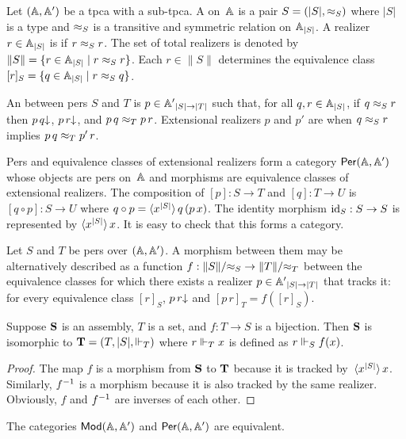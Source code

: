 Let $(\AA, \subAA)$ be a tpca with a sub-tpca. A  on~$\AA$ is a pair $S = (|S|, {\per_S})$ where
$|S|$ is a type and $\per_S$ is a transitive and symmetric
relation on $\xAtyp{S}$. A realizer $r \in \xAtyp{S}$ is  if
$r \per_S r$. The set of total realizers is denoted by $\|S\| = \set{r
  \in \xAtyp{S} \such r \per_S r}$. Each $r \in \|S\|$ determines
the equivalence class $[r]_S = \set{q \in \xAtyp{S} \such r \per_S q}$.

An  between pers $S$ and $T$ is $p \in
\compAtyp{|S| \to |T|}$ such that, for all $q, r \in \xAtyp{S}$, if $q
\per_S r$ then $\defined{p\,q}$, $\defined{p\,r}$, and $p\,q \per_T
p\,r$. Extensional realizers $p$ and $p'$ are  when
$q \per_S r$ implies $p\,q \per_T p'\,r$.

Pers and equivalence classes of extensional realizers form a category
$\Per{\AA, \subAA}$ whose objects are pers on~$\AA$ and morphisms are
equivalence classes of extensional realizers. The composition of $[p]
: S \to T$ and $[q] : T \to U$ is $[q \circ p] : S \to U$ where $q
\circ p = \tpcalam{x}{|S|}{q\,(p\,x)}$. The identity morphism
$\id[S] : S \to S$ is represented by $\tpcalam{x}{|S|} x$. It
is easy to check that this forms a category.

Let $S$ and $T$ be pers over $(\AA, \subAA)$. A morphism between them
may be alternatively described as a function $f : \|S\|/{\per_S} \to
\|T\|/{\per_T}$ between the equivalence classes for which there exists
a realizer $p \in \compAtyp{|S| \to |T|}$ that tracks it: for every
equivalence class $[r]_S$, $\defined{p\,r}$ and $[p\,r]_T = f([r]_S)$.

\begin{lemma}
  \label{lemma:iso-assembly}
  Suppose $\asm{S}$ is an assembly, $T$ is a set, and $f : T \to S$ is
  a bijection. Then $\asm{S}$ is isomorphic to $\asm{T} = (T, |S|,
  {\rz_T})$ where $r \rz_T x$ is defined as $r \rz_S f(x)$.
\end{lemma}

\begin{proof}
  The map $f$ is a morphism from $\asm{S}$ to $\asm{T}$ because it is
  tracked by~$\tpcalam{x}{|S|}{x}$. Similarly, $\inv{f}$ is a
  morphism because it is also tracked by the same realizer. Obviously,
  $f$ and $\inv{f}$ are inverses of each other.
\end{proof}


\begin{proposition}
  The categories $\Mod{\AA, \subAA}$ and $\Per{\AA, \subAA}$ are
  equivalent.
\end{proposition}

